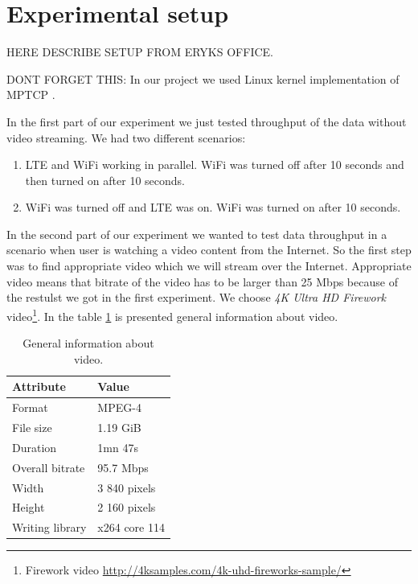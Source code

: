 \documentclass{llncs}
\begin{document}
\section{Experimental setup}
HERE DESCRIBE SETUP FROM ERYKS OFFICE.

DONT FORGET THIS: In our project we used Linux kernel implementation of MPTCP \cite{linuxMPTCP}. 

In the first part of our experiment we just tested throughput of the data without video streaming. We had two different scenarios:

\begin{enumerate}
\item{LTE and WiFi working in parallel. WiFi was turned off after 10 seconds and then turned on after 10 seconds.}
\item{WiFi was turned off and LTE was on. WiFi was turned on after 10 seconds.}
\end{enumerate}

In the second part of our experiment we wanted to test data throughput in a scenario when user is watching a video content from the Internet. So the first step was to find appropriate video which we will stream over the Internet. Appropriate video means that bitrate of the video has to be larger than 25 Mbps because of the  restulst we got in the first experiment. We choose \emph{4K Ultra HD Firework }video\footnote{Firework video \url{http://4ksamples.com/4k-uhd-fireworks-sample/}}. In the table \ref{tab:video} is presented general information about video. 

\begin{table}
\centering
\begin{tabular}{l|l}
Attribute & Value \\\hline
Format & MPEG-4 \\
File size & 1.19 GiB \\
Duration & 1mn 47s \\ 
Overall bitrate & 95.7 Mbps \\
Width & 3 840 pixels \\
Height & 2 160 pixels \\
Writing library \hspace{10mm}  &  x264 core 114 \\
\end{tabular}
\caption{\label{tab:video}General information about video.}
\end{table}
\end{document}
